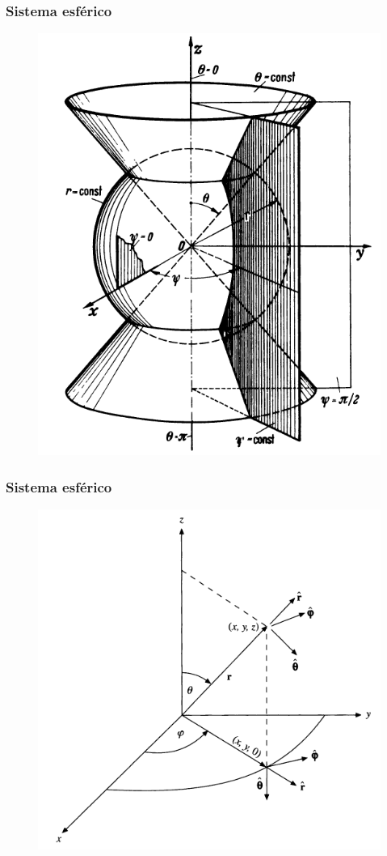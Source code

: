 \documentclass[12pt]{beamer}
\begin{document}
\begin{frame}
\frametitle{Sistema esférico}
\begin{figure}
  \centering
  \includegraphics[scale=1]{Imagenes/Planos_Coordenadas_Esfericas.png}
\end{figure}
\end{frame}
\begin{frame}
\frametitle{Sistema esférico}
\begin{figure}
  \centering
  \includegraphics[scale=0.35]{Imagenes/CoordenadasEsfericasVectoresUnitarios.png}
\end{figure}
\end{frame}
\end{document}

